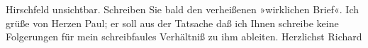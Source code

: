 \begin{ledgroupsized}[t]{13cm}
                  Hirschfeld unsichtbar. Schreiben {\pb}Sie bald den verheißenen
               »wirklichen Brief«. Ich grüße von Herzen Paul;
               er soll aus der Tatsache daß ich Ihnen schreibe keine Folgerungen für mein
               schreibfaules Verhältniß zu ihm ableiten. Herzlichst\pend
           \pstart \spacefill\mbox{Richard}\pend{}
         
         \endnumbering{}\end{ledgroupsized}  \newcommand{\dateiname}{L00667}\newcommand{\titel}{Richard Beer-Hofmann an Arthur Schnitzler, 21. 4. 1897}\newcommand{\editorInnen}{Martin Anton Müller und Gerd-Hermann Susen}
      